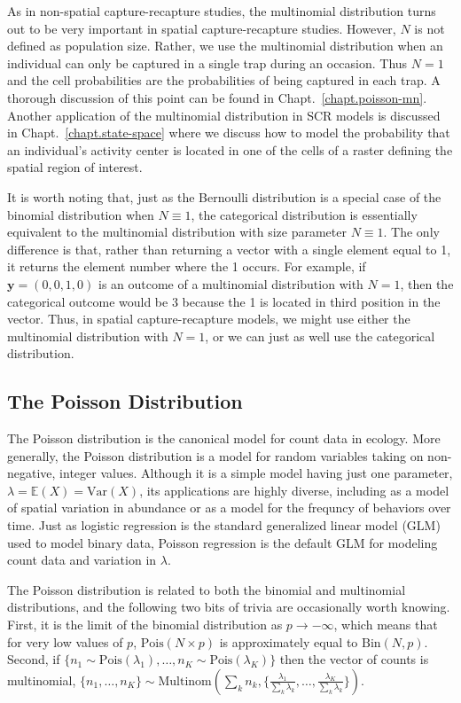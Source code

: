 As in non-spatial capture-recapture studies, the multinomial
distribution turns out to be very important in spatial
capture-recapture studies. However, $N$ is not defined as population
size. Rather, we use the multinomial distribution when an individual
can only be captured in a single trap during an occasion. Thus
$N=1$ and the cell probabilities are the probabilities of
being captured in each trap. A thorough discussion of this point can
be found in Chapt.~\ref{chapt.poisson-mn}. Another application of the
multinomial distribution in SCR models is discussed in
Chapt.~\ref{chapt.state-space} where we discuss how to model the
probability that an individual's activity center is located in one of
the cells of a raster defining the spatial region of interest.

It is worth noting that, just as the Bernoulli distribution is a
special case of the binomial distribution when $N \equiv 1$, the
categorical distribution is essentially equivalent to
the multinomial distribution with size parameter
$N\equiv1$. The only difference is that, rather than returning a
vector with a single element equal to 1, it returns the element number
where the 1 occurs. For example, if $\mathbf{y}=(0,0,1,0)$ is an outcome of a
multinomial distribution with $N=1$, then the categorical outcome
would be 3 because the 1 is located in third position in the vector. Thus, in spatial
capture-recapture models, we might use either the multinomial
distribution with $N=1$, or we can just as well use the categorical
distribution. %


\subsection{The Poisson Distribution}


The Poisson distribution is the canonical model for count data in
ecology.  More generally, the
Poisson distribution is a model for random variables taking on
non-negative, integer values.  Although it is a simple model having just one
parameter, $\lambda = \mathbb{E}(X) = \text{Var}(X)$, its applications
are highly diverse, including
as a model of spatial variation in abundance or as a model for the
frequncy of behaviors over time.  Just as logistic regression is the
standard generalized linear model (GLM) used to model binary data, Poisson
regression is the default GLM for modeling count data and variation in
$\lambda$.

The Poisson distribution is related to
both the binomial and multinomial distributions, and the following two
bits of trivia are occasionally worth knowing. First, it is the limit of the binomial
distribution as $p \to -\infty$, which means that for very low values
of $p$, $\text{Pois}(N\times p)$ is approximately equal to $\text{Bin}(N,
p)$. Second, if $\{n_1 \sim \text{Pois}(\lambda_1),
\dots, n_K \sim \text{Pois}(\lambda_K)\}$
then the vector of counts is multinomial, $\{n_1, \dots, n_K\}
\sim \text{Multinom}(\sum_k n_k, \{\frac{\lambda_1}{\sum_k \lambda_k},
\dots, \frac{\lambda_K}{\sum_k \lambda_k}
\})$.

